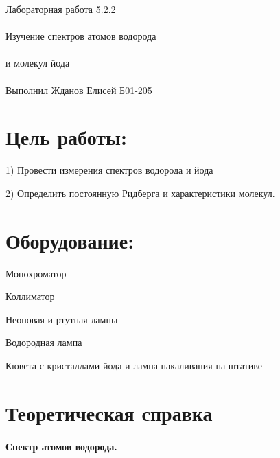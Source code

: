 \documentclass{astroedu-lab}
\begin{document}
\pagestyle{plain}

\begin{problem}{\huge Лабораторная работа 5.2.2\\\\Изучение спектров атомов водорода\\\\и молекул йода\\\\Выполнил Жданов Елисей Б01-205}

\section{Цель работы:}

1) Провести измерения спектров водорода и йода

2) Определить постоянную Ридберга и характеристики молекул.

\section{Оборудование:}

Монохроматор

Коллиматор

Неоновая и ртутная лампы

Водородная лампа

Кювета с кристаллами йода и лампа накаливания на штативе


\section{Теоретическая справка}
	
	\paragraph{Спектр атомов водорода.}
	

\end{problem}
\end{document}
